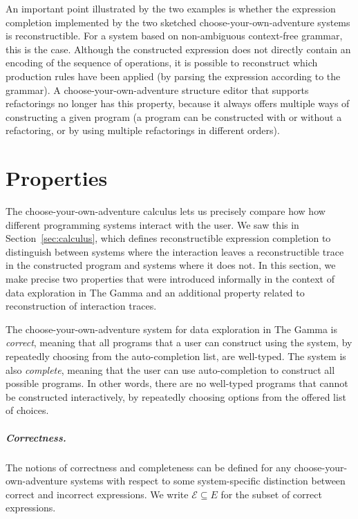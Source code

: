 \documentclass[ a4paper,UKenglish,cleveref, autoref, thm-restate]{lipics-v2021}
\begin{document}
An important point illustrated by the two examples is whether the expression completion
implemented by the two sketched choose-your-own-adventure systems is reconstructible.
For a system based on non-ambiguous context-free grammar, this is the case.
Although the constructed expression does not directly contain an encoding of the
sequence of operations, it is possible to reconstruct which production rules have been applied
(by parsing the expression according to the grammar). A choose-your-own-adventure structure
editor that supports refactorings no longer has this property, because it always offers multiple
ways of constructing a given program (a program can be constructed with or without a refactoring,
or by using multiple refactorings in different orders).

\newpage

\section{Properties}
\label{sec:properties}

The choose-your-own-adventure calculus lets us precisely compare how how different
programming systems interact with the user. We saw this in Section~\ref{sec:calculus}, which
defines reconstructible expression completion to distinguish between systems where the
interaction leaves a reconstructible trace in the constructed program and systems where it does not.
In this section, we make precise two properties that were introduced informally in the context of
data exploration in The Gamma \cite{petricek-2022-thegamma} and an additional property related
to reconstruction of interaction traces.

The choose-your-own-adventure system for data exploration in The Gamma is \emph{correct}, meaning that
all programs that a user can construct using the system, by repeatedly choosing from the
auto-completion list, are well-typed. The system is also \emph{complete}, meaning that the user can
use auto-completion to construct all possible programs. In other words, there are no well-typed programs
that cannot be constructed interactively, by repeatedly choosing options from the offered list of
choices.

\subparagraph{Correctness.}
The notions of correctness and completeness can be defined for any
choose-your-own-adventure systems with respect to some system-specific distinction between
correct and incorrect expressions. We write $\mathcal{E} \subseteq E$ for the subset
of correct expressions.
\end{document}
